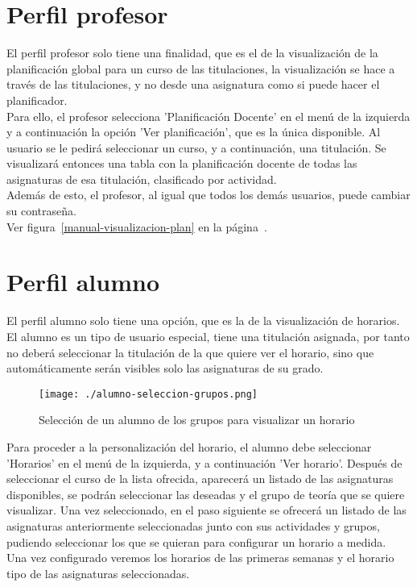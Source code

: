 \section{Perfil profesor}
\label{manual_perfil_profesor}
El perfil profesor solo tiene una finalidad, que es el de la visualización de la planificación global para un curso de las titulaciones, la visualización se hace a través de las titulaciones, y no desde una asignatura como si puede hacer el planificador.\\

Para ello, el profesor selecciona 'Planificación Docente' en el menú de la izquierda y a continuación la opción 'Ver planificación', que es la única disponible. Al usuario se le pedirá seleccionar un curso, y a continuación, una titulación. Se visualizará entonces una tabla con la planificación docente de todas las asignaturas de esa titulación, clasificado por actividad.\\

Además de esto, el profesor, al igual que todos los demás usuarios, puede cambiar su contraseña.
\\
Ver figura~\ref{manual-visualizacion-plan} en la página~\pageref{manual-visualizacion-plan}.

\section{Perfil alumno}

El perfil alumno solo tiene una opción, que es la de la visualización de horarios.\\

El alumno es un tipo de usuario especial, tiene una titulación asignada, por tanto no deberá seleccionar la titulación de la que quiere ver el horario, sino que automáticamente serán visibles solo las asignaturas de su grado.\\


\begin{figure}[H] 
  \label{manual-alumno-seleccion} 
	\begin{center}
    \texttt{[image: ./alumno-seleccion-grupos.png]}
  \end{center}
\caption{Selección de un alumno de los grupos para visualizar un horario}
\end{figure}

Para proceder a la personalización del horario, el alumno debe seleccionar 'Horarios' en el menú de la izquierda, y a continuación 'Ver horario'. Después de seleccionar el curso de la lista ofrecida, aparecerá un listado de las asignaturas disponibles, se podrán seleccionar las deseadas y el grupo de teoría que se quiere visualizar. Una vez seleccionado, en el paso siguiente se ofrecerá un listado de las asignaturas anteriormente seleccionadas junto con sus actividades y grupos, pudiendo seleccionar los que se quieran para configurar un horario a medida.\\

Una vez configurado veremos los horarios de las primeras semanas y el horario tipo de las asignaturas seleccionadas.
